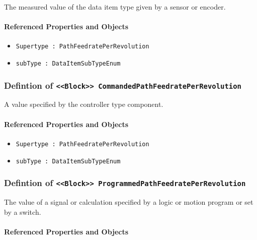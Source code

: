 The measured value of the data item type given by a sensor or encoder.

\FloatBarrier
\paragraph{Referenced Properties and Objects}

\begin{itemize}
\item \texttt{Supertype : PathFeedratePerRevolution}

\item \texttt{subType : DataItemSubTypeEnum}

\end{itemize}
\FloatBarrier
\subsubsection{Defintion of \texttt{<<Block>> CommandedPathFeedratePerRevolution}}
  \label{type:CommandedPathFeedratePerRevolution}

\FloatBarrier

A value specified by the controller type component.

\FloatBarrier
\paragraph{Referenced Properties and Objects}

\begin{itemize}
\item \texttt{Supertype : PathFeedratePerRevolution}

\item \texttt{subType : DataItemSubTypeEnum}

\end{itemize}
\FloatBarrier
\subsubsection{Defintion of \texttt{<<Block>> ProgrammedPathFeedratePerRevolution}}
  \label{type:ProgrammedPathFeedratePerRevolution}

\FloatBarrier

The value of a signal or calculation specified by a logic or motion program or set by a switch.

\FloatBarrier
\paragraph{Referenced Properties and Objects}

